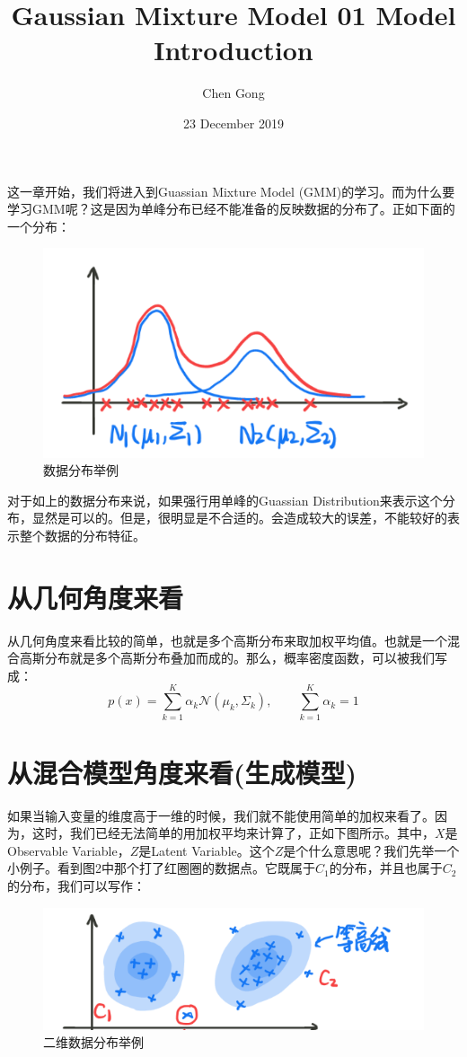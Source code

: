 \documentclass[a4paper]{article}
\title{Gaussian Mixture Model 01 Model Introduction}
\author{Chen Gong}
\date{23 December 2019}
\begin{document}
\maketitle
这一章开始，我们将进入到Guassian Mixture Model (GMM)的学习。而为什么要学习GMM呢？这是因为单峰分布已经不能准备的反映数据的分布了。正如下面的一个分布：
\begin{figure}[H]
    \centering
    \includegraphics[width=.55\textwidth]{微信图片_20191223221952.png}
    \caption{数据分布举例}
    \label{fig:my_label_1}
\end{figure}

对于如上的数据分布来说，如果强行用单峰的Guassian Distribution来表示这个分布，显然是可以的。但是，很明显是不合适的。会造成较大的误差，不能较好的表示整个数据的分布特征。

\section{从几何角度来看}
从几何角度来看比较的简单，也就是多个高斯分布来取加权平均值。也就是一个混合高斯分布就是多个高斯分布叠加而成的。那么，概率密度函数，可以被我们写成：
\begin{equation}
    p(x) = \sum_{k=1}^K \alpha_k \mathcal{N}(\mu_k, \Sigma_k), \qquad \sum_{k=1}^K \alpha_k = 1
\end{equation}

\section{从混合模型角度来看(生成模型)}
如果当输入变量的维度高于一维的时候，我们就不能使用简单的加权来看了。因为，这时，我们已经无法简单的用加权平均来计算了，正如下图所示。其中，$X$是Observable Variable，$Z$是Latent Variable。这个$Z$是个什么意思呢？我们先举一个小例子。看到图2中那个打了红圈圈的数据点。它既属于$C_1$的分布，并且也属于$C_2$的分布，我们可以写作：
\begin{figure}[H]
    \centering
    \includegraphics[width=.65\textwidth]{微信图片_20191223223203.png}
    \caption{二维数据分布举例}
    \label{fig:my_label_1}
\end{figure}
\end{document}
